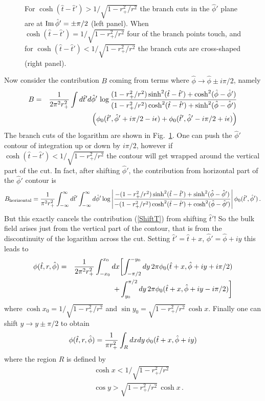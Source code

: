 \documentclass[12pt]{article}
\newcommand{\be}{\begin{equation}}
\newcommand{\ee}{\end{equation}}
\newcommand{\bea}{\begin{eqnarray}}
\newcommand{\eea}{\end{eqnarray}}
\newcommand{\beas}{\begin{eqnarray*}}
\newcommand{\eeas}{\end{eqnarray*}}
\newcommand{\htt}{\hat{t}}
\newcommand{\hp}{\hat{\phi}}
\begin{document}
\begin{figure}
\centerline{ \hspace{2cm} }
\caption{For $\cosh (\htt - \htt') > 1/\sqrt{1 - r_+^2/r^2}$ the branch cuts in the $\hp'$ plane are at
${\rm Im} \, \hp' = \pm \pi / 2$ (left panel).  When $\cosh(\htt - \htt') = 1/\sqrt{1 - r_+^2/r^2}$ four of
the branch points touch, and for $\cosh(\htt - \htt') < 1/\sqrt{1 - r_+^2/r^2}$ the branch cuts are cross-shaped
(right panel).}
\label{Phicuts}
\end{figure}

Now consider the contribution $B$ coming from terms where $\hp \rightarrow \hp \pm i \pi / 2$, namely
%
\beas
B & = & {1 \over 2 \pi^2 r_+^2} \int d\htt' d\hp' \, \log { (1 - r_+^2 / r^2) \sinh^2 (\htt - \htt') + \cosh^2 (\hp - \hp') \over
                                                    (1 - r_+^2 / r^2) \cosh^2 (\htt - \htt') + \sinh^2 (\hp - \hp')} \\
& & \qquad\qquad \left(\phi_0(\htt',\hp' + i \pi / 2 - i \epsilon) + \phi_0(\htt',\hp' - i \pi/2 + i \epsilon)\right)
\eeas
%
The branch cuts of the logarithm are shown in Fig.~\ref{Phicuts}.  One
can push the $\hp'$ contour of integration up or down by $i \pi / 2$,
however if $\cosh (\htt - \htt') < 1/\sqrt{1 - r_+^2 / r^2}$ the
contour will get wrapped around the vertical part of the cut.  In
fact, after shifting $\hp'$, the contribution from horizontal part of
the $\hp'$ contour is
%
\be
\label{ShiftPhi}
B_{\rm horizontal} = {1 \over \pi^2 r_+^2} \int_{-\infty}^\infty d\htt' \int_{-\infty}^\infty d\hp' \log \left\vert
{- (1 - r_+^2 / r^2) \sinh^2 (\htt - \htt') + \sinh^2 (\hp - \hp') \over
 - (1 - r_+^2 / r^2) \cosh^2 (\htt - \htt') + \cosh^2 (\hp - \hp')} \right\vert
\phi_0(\htt',\hp')\,.
\ee
%
But this exactly cancels the contribution (\ref{ShiftT}) from shifting $\htt'$!  So the bulk field arises just
from the vertical part of the contour, that is from the discontinuity of the logarithm across the cut.  Setting
$\htt' = \htt + x$, $\hp' = \hp + i y$ this leads to
%
\beas
\phi(\htt,r,\hp) & = & {1 \over 2 \pi^2 r_+^2} \int_{-x_0}^{x_0} dx \biggl[
\int_{-\pi/2}^{-y_0} dy \, 2 \pi \phi_0(\htt + x,\hp + iy + i \pi/2) \\
& & \qquad\qquad\quad\,\,\, + \int_{y_0}^{\pi/2} dy \, 2 \pi \phi_0(\htt + x, \hp + i y - i \pi / 2)\biggr]
\eeas
%
where $\cosh x_0 = 1/\sqrt{1 - r_+^2 / r^2}$ and $\sin y_0 = \sqrt{1 - r_+^2 / r^2} \, \cosh x$.  Finally one can shift
$y \rightarrow y \pm \pi/2$ to obtain
%
\be
\label{MasslessSmear}
\phi(\htt,r,\hp) = {1 \over \pi r_+^2} \int_R dx dy \, \phi_0(\htt + x, \hp + i y)
\ee
%
where the region $R$ is defined by
%
\bea
\label{regionR}
&& \cosh x < 1/\sqrt{1 - r_+^2/r^2} \\
\nonumber
&& \cos y > \sqrt{1 - r_+^2/r^2} \, \cosh x\,.
\eea
%
\end{document}
